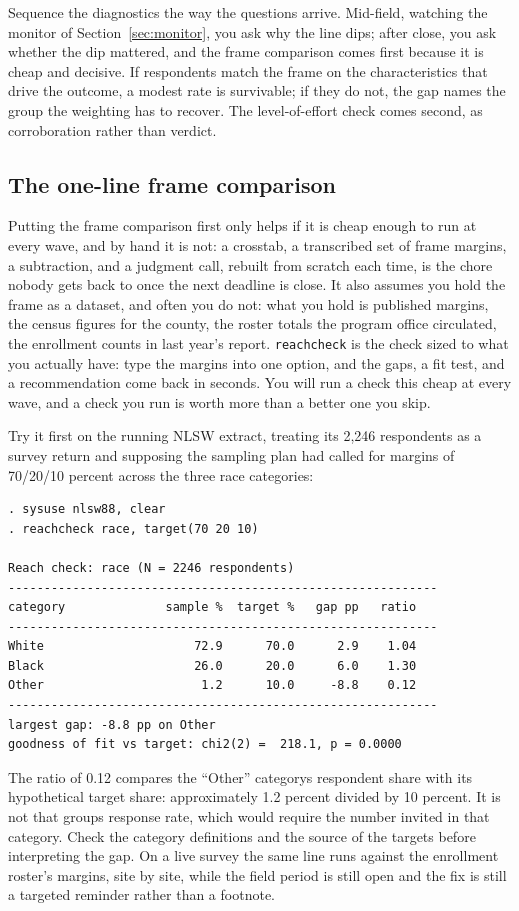 \documentclass[
    a4paper,
    fontsize=10pt,
    twoside=true,
    numbers=noenddot,
]{kaobook}
\begin{document}
Sequence the diagnostics the way the questions arrive. Mid-field, watching the monitor of Section~\ref{sec:monitor}, you ask why the line dips; after close, you ask whether the dip mattered, and the frame comparison comes first because it is cheap and decisive. If respondents match the frame on the characteristics that drive the outcome, a modest rate is survivable; if they do not, the gap names the group the weighting has to recover. The level-of-effort check comes second, as corroboration rather than verdict.

\subsection{The one-line frame comparison}\label{sec:ch05-reach}
Putting the frame comparison first only helps if it is cheap enough to run at every wave, and by hand it is not: a crosstab, a transcribed set of frame margins, a subtraction, and a judgment call, rebuilt from scratch each time, is the chore nobody gets back to once the next deadline is close. It also assumes you hold the frame as a dataset, and often you do not: what you hold is published margins, the census figures for the county, the roster totals the program office circulated, the enrollment counts in last year's report. \texttt{reachcheck} is the check sized to what you actually have: type the margins into one option, and the gaps, a fit test, and a recommendation come back in seconds. You will run a check this cheap at every wave, and a check you run is worth more than a better one you skip.

Try it first on the running NLSW extract, treating its 2{,}246 respondents as a survey return and supposing the sampling plan had called for margins of 70/20/10 percent across the three race categories:
\par
{\footnotesize
\begin{verbatim}
. sysuse nlsw88, clear
. reachcheck race, target(70 20 10)

Reach check: race (N = 2246 respondents)
------------------------------------------------------------
category              sample %  target %   gap pp   ratio
------------------------------------------------------------
White                     72.9      70.0      2.9    1.04
Black                     26.0      20.0      6.0    1.30
Other                      1.2      10.0     -8.8    0.12
------------------------------------------------------------
largest gap: -8.8 pp on Other
goodness of fit vs target: chi2(2) =  218.1, p = 0.0000
\end{verbatim}
}
The ratio of 0.12 compares the \enquote{Other} category\textquotesingle s respondent share with its hypothetical target share: approximately 1.2 percent divided by 10 percent. It is not that group\textquotesingle s response rate, which would require the number invited in that category. Check the category definitions and the source of the targets before interpreting the gap. On a live survey the same line runs against the enrollment roster's margins, site by site, while the field period is still open and the fix is still a targeted reminder rather than a footnote.
\end{document}
